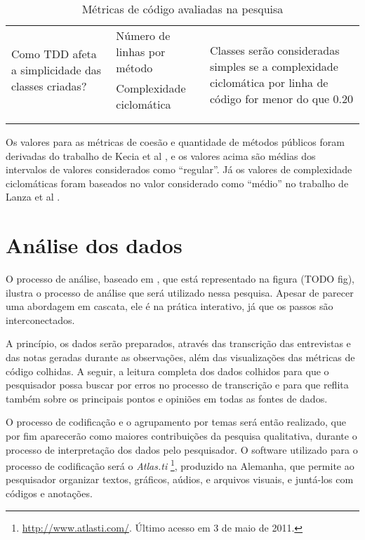 \begin{table}[h!]
\begin{tabular}{ | p{5cm} | p{5cm} | p{5cm} | }
		\multirow{2}{5cm}{Como TDD afeta a simplicidade das classes criadas?}
		& Número de linhas por método & 
		\multirow{4}{5cm}{Classes serão consideradas simples se a complexidade
		ciclomática por linha de código for menor do que 0.20 } \\
		& Complexidade ciclomática & \\
		& & \\ & & \\
		
		\hline
	\end{tabular}
	\label{tab:metricas}
	\caption{Métricas de código avaliadas na pesquisa}
\end{table}

Os valores para as métricas de coesão e quantidade de métodos públicos foram
derivadas do trabalho de Kecia et al \cite{kecia}, e os valores acima são médias
dos intervalos de valores considerados como ``regular''. Já os valores de
complexidade ciclomáticas foram baseados no valor considerado como ``médio'' no
trabalho de Lanza et al \cite{lanza}.

\section{Análise dos dados}
\label{sec:planejamento-analise}

O processo de análise, baseado em \cite{creswell}, que está representado na
figura (TODO fig), ilustra o processo de análise que será utilizado nessa
pesquisa. Apesar de parecer uma abordagem em cascata, ele é na prática 
interativo, já que os passos são interconectados. 

A princípio, os dados serão preparados, através das transcrição das
entrevistas e das notas geradas durante as observações, além das
visualizações das métricas de código colhidas. A seguir, a leitura completa dos
dados colhidos para que o pesquisador possa buscar por erros no processo de
transcrição e para que reflita também sobre os principais pontos e opiniões em
todas as fontes de dados.

O processo de codificação e o agrupamento
por temas será então realizado, que por fim aparecerão como maiores
contribuições da pesquisa qualitativa, durante o processo de interpretação dos
dados pelo pesquisador. O software utilizado para o processo de codificação será
o \textit{Atlas.ti} \footnote{\url{http://www.atlasti.com/}. Último acesso em 3
de maio de 2011.}, produzido na Alemanha, que permite ao pesquisador organizar textos,
gráficos, aúdios, e arquivos visuais, e juntá-los com códigos e anotações. 

